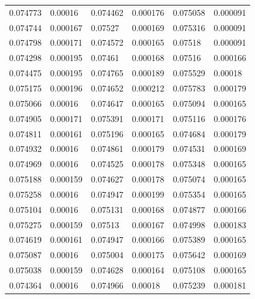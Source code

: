 \documentclass [11pt, proquest] {uwthesis}[2020/02/24]
\begin{document}
\begin{table}[H]
\begin{tabular}{llllll}
0.074773 & 0.00016 & 0.074462 & 0.000176 & 0.075058 & 0.000091 \\
0.074744 & 0.000167 & 0.07527 & 0.000169 & 0.075316 & 0.000091 \\
0.074798 & 0.000171 & 0.074572 & 0.000165 & 0.07518 & 0.000091 \\
0.074298 & 0.000195 & 0.07461 & 0.000168 & 0.07516 & 0.000166 \\
0.074475 & 0.000195 & 0.074765 & 0.000189 & 0.075529 & 0.00018 \\
0.075175 & 0.000196 & 0.074652 & 0.000212 & 0.075783 & 0.000179 \\
0.075066 & 0.00016 & 0.074647 & 0.000165 & 0.075094 & 0.000165 \\
0.074905 & 0.000171 & 0.075391 & 0.000171 & 0.075116 & 0.000176 \\
0.074811 & 0.000161 & 0.075196 & 0.000165 & 0.074684 & 0.000179 \\
0.074932 & 0.00016 & 0.074861 & 0.000179 & 0.074531 & 0.000169 \\
0.074969 & 0.00016 & 0.074525 & 0.000178 & 0.075348 & 0.000165 \\
0.075188 & 0.000159 & 0.074627 & 0.000178 & 0.075074 & 0.000165 \\
0.075258 & 0.00016 & 0.074947 & 0.000199 & 0.075354 & 0.000165 \\
0.075104 & 0.00016 & 0.075131 & 0.000168 & 0.074877 & 0.000166 \\
0.075275 & 0.000159 & 0.07513 & 0.000167 & 0.074998 & 0.000183 \\
0.074619 & 0.000161 & 0.074947 & 0.000166 & 0.075389 & 0.000165 \\
0.075087 & 0.00016 & 0.075004 & 0.000175 & 0.075642 & 0.000169 \\
0.075038 & 0.000159 & 0.074628 & 0.000164 & 0.075108 & 0.000165 \\
0.074364 & 0.00016 & 0.074966 & 0.00018 & 0.075239 & 0.000181
\end{tabular}
\end{table}
\end{document}
